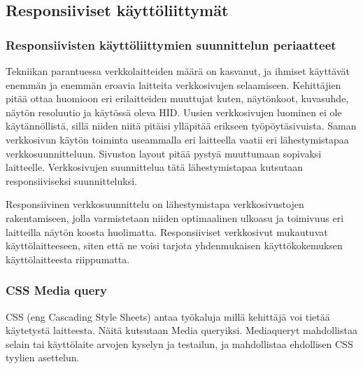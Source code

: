 \documentclass[11pt,a4paper,titlepage,oneside]{article}
\begin{document}
\newpage
\subsection{Responsiiviset käyttöliittymät}        %

\subsubsection{Responsiivisten käyttöliittymien suunnittelun periaatteet}







Tekniikan parantuessa verkkolaitteiden määrä on kasvanut, ja ihmiset käyttävät enemmän ja enemmän eroavia laitteita verkkosivujen selaamiseen.\citemissing
Kehittäjien pitää ottaa huomioon eri erilaitteiden muuttujat kuten, näytönkoot, kuvasuhde, näytön resoluutio ja käytössä oleva HID.\citemissing
Uusien verkkosivujen luominen ei ole käytännöllistä, sillä niiden niitä pitäisi ylläpitää erikseen työpöytäsivuista.
Saman verkkosivun käytön toiminta useammalla eri laitteella vaatii eri lähestymistapaa verkkosuunnitteluun. 
Sivuston layout pitää pystyä muuttumaan sopivaksi laitteelle.
Verkkosivujen suunnittelua tätä lähestymistapaa kutsutaan responsiiviseksi suunnitteluksi. \citemissing
\medskip



Responsiivinen verkkosuunnittelu on lähestymistapa verkkosivustojen rakentamiseen,
jolla varmistetaan niiden optimaalinen ulkoasu ja toimivuus eri laitteilla näytön koosta huolimatta.\citemissing
Responsiiviset verkkosivut mukautuvat käyttölaitteeseen, siten että ne voisi tarjota yhdenmukaisen käyttökokemuksen käyttölaitteesta riippumatta.
\medskip





\subsubsection{CSS Media query}


CSS (eng Cascading Style Sheets) antaa työkaluja millä kehittäjä voi tietää käytetystä laitteesta.
Näitä kutsutaan Media queryiksi.
Mediaqueryt mahdollistaa selain tai käyttölaite arvojen kyselyn ja testailun, ja mahdollistaa ehdollisen CSS tyylien asettelun.
\end{document}
